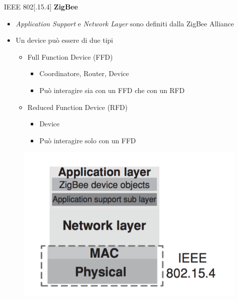 \begin{frame}{IEEE 802[.15.4]}
\textbf{ZigBee}
\begin{itemize}
	\item \textit{Application Support} e \textit{Network Layer} sono definiti dalla ZigBee Alliance
	\item Un device può essere di due tipi
	\begin{itemize}
		\item Full Function Device (FFD)
			\begin{itemize}
				\item Coordinatore, Router, Device
				\item Può interagire sia con un FFD che con un RFD
			\end{itemize}
		\item Reduced Function Device (RFD)
			\begin{itemize}
				\item Device
				\item Può interagire solo con un FFD
			\end{itemize}
	\end{itemize}
\end{itemize}
	\begin{figure}[h] 
		\includegraphics[scale=0.3,cfbox=blue_slides 1pt 0pt]{imgs/zbprot.png}
	\end{figure}
\end{frame}


